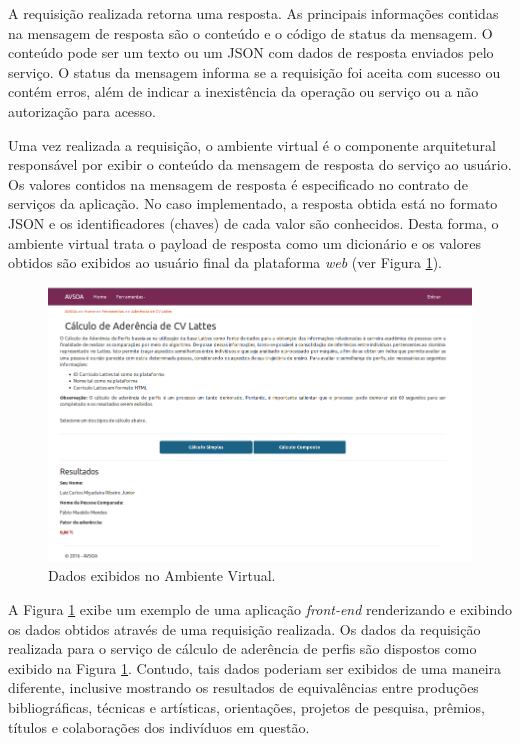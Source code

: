 A requisição realizada retorna uma resposta. As principais informações contidas na mensagem de resposta são o conteúdo e o código de status da mensagem. O conteúdo pode ser um texto ou um JSON com dados de resposta enviados pelo serviço. O status da mensagem informa se a requisição foi aceita com sucesso ou contém erros, além de indicar a inexistência da operação ou serviço ou a não autorização para acesso.

Uma vez realizada a requisição, o ambiente virtual é o componente arquitetural responsável por exibir o conteúdo da mensagem de resposta do serviço ao usuário. Os valores contidos na mensagem de resposta é especificado no contrato de serviços da aplicação. No caso implementado, a resposta obtida está no formato JSON e os identificadores (chaves) de cada valor são conhecidos. Desta forma, o ambiente virtual trata o payload de resposta como um dicionário e os valores obtidos são exibidos ao usuário final da plataforma \textit{web} (ver Figura \ref{print_ambiente_virtual}).

\begin{figure}[!hbt]
\centering
\includegraphics[scale=0.7]{figuras/print_avsoa.png}
\caption{Dados exibidos no Ambiente Virtual.}
\label{print_ambiente_virtual}
\end{figure}

A Figura \ref{print_ambiente_virtual} exibe um exemplo de uma aplicação \textit{front-end} renderizando e exibindo os dados obtidos através de uma requisição realizada. Os dados da requisição realizada para o serviço de cálculo de aderência de perfis são dispostos como exibido na Figura \ref{print_ambiente_virtual}. Contudo, tais dados poderiam ser exibidos de uma maneira diferente, inclusive mostrando os resultados de equivalências entre produções bibliográficas, técnicas e artísticas, orientações, projetos de pesquisa, prêmios, títulos e colaborações dos indivíduos em questão.

